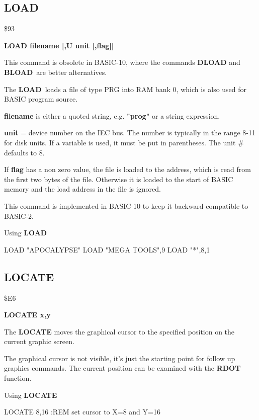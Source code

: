 \subsection{LOAD}
\begin{description}[leftmargin=3cm,style=nextline]
\item [Token:] \$93
\item [Format:] {\bf LOAD filename [,U unit [,flag]]}
\item [Usage:]
   This command is obsolete in BASIC-10, where the commands
   {\bf DLOAD} and {\bf BLOAD} are better alternatives.

   The {\bf LOAD} loads a file of type
   PRG into RAM bank 0, which is also used for BASIC program source.

   {\bf filename} is either a quoted string, e.g. {\bf "prog"} or
   a string expression.

   {\bf unit} = device number on the IEC bus.
   The number is typically in the range 8-11 for disk units.
   If a variable is used, it must be put in parentheses.
   The unit \# defaults to 8.

   If {\bf flag} has a non zero value, the file is loaded to
   the address, which is read from the first two bytes of the file.
   Otherwise it is loaded to the start of BASIC memory and
   the load address in the file is ignored.

\item [Remarks:]
   This command is implemented in BASIC-10 to keep it backward
   compatible to BASIC-2.

\item [Example:] Using {\bf LOAD}
\begin{screenoutput}
  LOAD "APOCALYPSE"
  LOAD "MEGA TOOLS",9
  LOAD "*",8,1
\end{screenoutput}
\end{description}


\newpage
\subsection{LOCATE}
\begin{description}[leftmargin=3cm,style=nextline]
\item [Token:] \$E6
\item [Format:] {\bf LOCATE x,y}
\item [Usage:] The {\bf LOCATE} moves the graphical cursor to
               the specified position on the current graphic screen.

\item [Remarks:] The graphical cursor is not visible, it's just
                 the starting point for follow up graphics commands.
                 The current position can be examined with the
                 {\bf RDOT} function.
\item [Example:] Using {\bf LOCATE}
\begin{screenoutput}
 LOCATE 8,16     :REM set cursor to X=8 and Y=16
\end{screenoutput}
\end{description}

